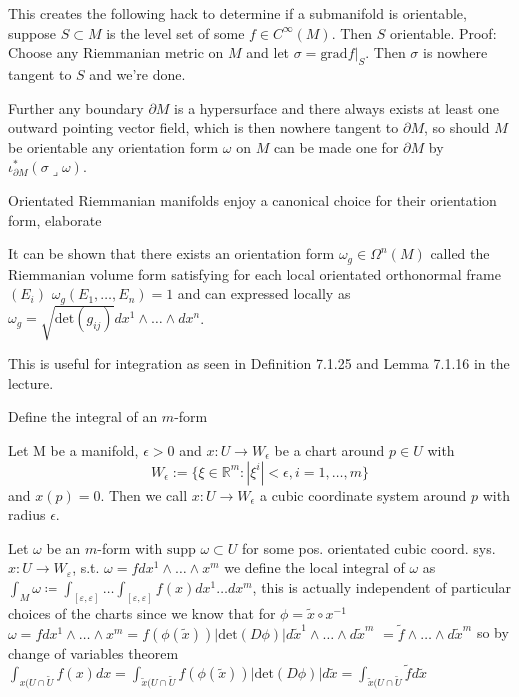 This creates the following hack to determine if a submanifold is orientable,
suppose \( S \subset M \)  is the level set of some \( f \in C^\infty(M) \). Then \( S \) orientable.
Proof:
Choose any Riemmanian metric on \( M \) and let \( \sigma = \text{grad} f|_S \). Then \( \sigma \)
is nowhere tangent to \( S \) and we're done.

Further any boundary \( \partial M \) is a hypersurface and there always exists at least one outward pointing vector field,
which is then nowhere tangent to \( \partial M \), so should \( M \) be orientable any orientation form \( \omega \) on \( M \) 
can be made one for \( \partial M \) by \( \iota^\ast_{\partial M}(\sigma \lrcorner \omega) \).

Orientated Riemmanian manifolds enjoy a canonical choice for their orientation form, elaborate 

It can be shown that there exists an orientation form \( \omega_g \in \Omega^n(M) \) called 
the Riemmanian volume form satisfying for each local orientated orthonormal frame \( (E_i) \)
\( \omega_g(E_1, \dots, E_n) = 1 \)
and can expressed locally as
\( \omega_g = \sqrt{\text{det}(g_{ij})} dx^1 \wedge \dots \wedge dx^n \).

This is useful for integration  as seen in Definition 7.1.25 and Lemma 7.1.16 in the lecture.


Define the integral of an \( m \)-form

Let M be a manifold, \(\epsilon > 0\) and \(x: U \to W_\epsilon\) be a chart around \(p \in U\) with
\[W_\epsilon := \{\xi \in \mathbb{R}^m : |\xi^i| < \epsilon, i = 1, \dots, m\} \]
and \(x(p) = 0\). Then we call \(x: U \to W_\epsilon\) a cubic coordinate system around \(p\) with radius \(\epsilon\).

Let \( \omega  \) be an \( m \)-form with \( \text{supp } \omega \subset U \) for some pos. orientated cubic coord. sys. \( x : U \to W_\varepsilon \),
s.t.
\( \omega = f dx^1 \wedge \dots \wedge x^m \)
we define the local integral of \( \omega \) as
\( \int_M \omega \coloneqq \int_{[\varepsilon, \varepsilon]} \dots \int_{[\varepsilon, \varepsilon]} f(x) dx^1 \dots dx^m \),
this is actually independent of particular choices of the charts since we know that for \( \phi = \tilde{x} \circ x^{-1} \)
\( \omega = f dx^1 \wedge \dots \wedge x^m = f(\phi(\tilde{x})) |\text{det}(D\phi)| d\tilde{x}^1 \wedge \dots \wedge d\tilde{x}^m \)
\( = \tilde{f} \wedge \dots \wedge d\tilde{x}^m\)
so by change of variables theorem
\( \int_{x(U \cap \tilde{U}} f(x) dx = \int_{\tilde{x}(U \cap \tilde{U}} f(\phi(\tilde{x})) |\text{det}(D\phi)| d\tilde{x} = \int_{\tilde{x}(U \cap \tilde{U}} \tilde{f} d\tilde{x} \)

